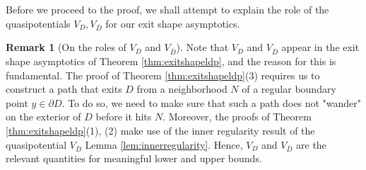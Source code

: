 \documentclass[10pt, reqno]{amsart}
\theoremstyle{definition}
\newtheorem{rem}{Remark}
\numberwithin{lem}{section}
\numberwithin{cor}{section}
\numberwithin{prop}{section}
\numberwithin{thm}{section}
\numberwithin{dfn}{section}
\begin{document}
Before we proceed to the proof, we shall attempt to explain the role of the quasipotentials  $V_D, V_{\bar{D}}$ for our exit shape asymptotics.

\begin{rem}[On the roles of $V_D$ and $V_{\bar{D}}$]\label{rem:VD} 
Note that $V_D$ and $V_{\bar{D}}$ appear in the exit shape asymptotics of Theorem \ref{thm:exitshapeldp}, and the reason for this is fundamental. The proof of Theorem \ref{thm:exitshapeldp}(3) requires us to construct a path that exits $D$ from a neighborhood $N$ of a regular boundary point $y\in\partial D$. To do so, we need to make sure that such a path does not "wander" on the exterior of $D$ before it hits $N.$ Moreover, the proofs of Theorem \ref{thm:exitshapeldp}(1), (2) make use of the inner regularity result of the quasipotential $V_{\bar{D}}$ Lemma \ref{lem:innerregularity}.
Hence, $V_D$ and $V_{\bar{D}}$ are the relevant quantities for meaningful lower and upper bounds. 
\end{rem}
\end{document}
